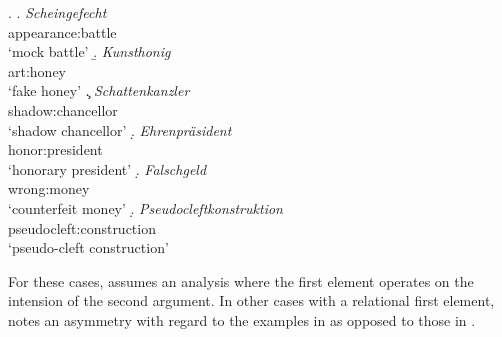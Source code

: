 \ex. \label{fanselow:abNOTb} 
\a. \label{fanselow:abNOTb:scheingefecht}
\gll
\emph{Scheingefecht}\\
appearance:battle\\ 
`mock battle'
\b. \gll
\emph{Kunsthonig}\\
art:honey\\ 
`fake honey'
\c. \gll 
\emph{Schattenkanzler}\\
shadow:chancellor\\ 
`shadow chancellor'
\d. \gll 
\emph{Ehrenpräsident}\\
honor:president\\
`honorary president'
\d. \gll 
\emph{Falschgeld}\\
wrong:money\\
`counterfeit money'
\d. \gll 
\emph{Pseudocleft\-konstruktion}\footnotemark \\
pseudocleft:construction\\ 
`pseudo-cleft construction' 

For these cases, \citet[105]{Fanselow:1981} assumes an analysis where
the first element operates on the intension of the second argument.
In other cases with a relational first element, \citet[107]{Fanselow:1981} notes an asymmetry
with regard to the examples in \Next as opposed to those in \NNext.

